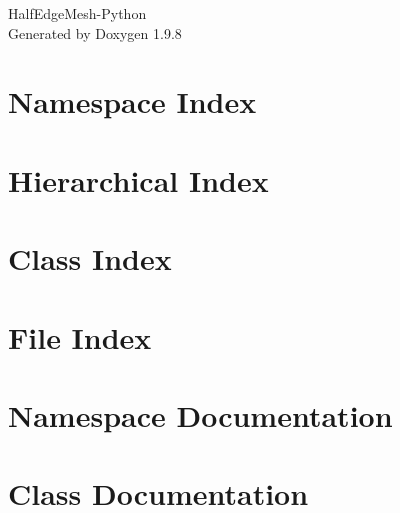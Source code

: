 \documentclass[twoside]{book}
\newcommand{\+}{\discretionary{\mbox{\scriptsize$\hookleftarrow$}}{}{}}
\newcommand{\clearemptydoublepage}{%
    \newpage{\pagestyle{empty}\cleardoublepage}%
  }
\begin{document}
  \raggedbottom
    \hypersetup{pageanchor=false,
                bookmarksnumbered=true,
                pdfencoding=unicode
               }
  \begin{titlepage}
  \vspace*{7cm}
  \begin{center}%
  {\Large Half\+Edge\+Mesh-\/\+Python}\\
  \vspace*{1cm}
  {\large Generated by Doxygen 1.9.8}\\
  \end{center}
  \end{titlepage}
  \clearemptydoublepage
  \tableofcontents
  \clearemptydoublepage
  \hypersetup{pageanchor=true}


\chapter{Namespace Index}

\chapter{Hierarchical Index}

\chapter{Class Index}

\chapter{File Index}

\chapter{Namespace Documentation}














\chapter{Class Documentation}








\end{document}
